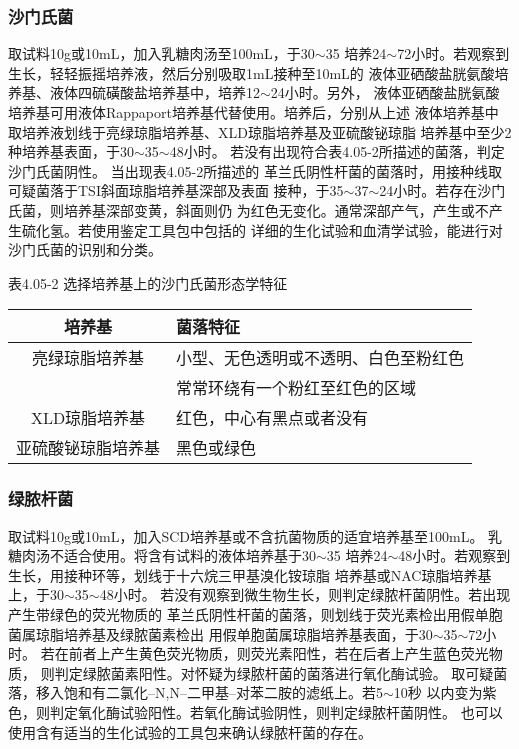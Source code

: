 \documentclass[11pt,a4paper]{article}
\newenvironment{SC}{%
  \CJKfamily{gbsn}%
  \CJKtilde
  \CJKnospace}{}
\begin{document}
\begin{CJK}{UTF8}{}
\begin{SC}
\subsubsection{沙门氏菌\endnote{}}
取试料10g或10mL，加入乳糖肉汤至100mL，于30$\sim$35\textcelsius
培养24$\sim$72小时。若观察到生长，轻轻振摇培养液，然后分别吸取1mL接种至10mL的
液体亚硒酸盐胱氨酸培养基、液体四硫磺酸盐培养基中，培养12$\sim$24小时。另外，
液体亚硒酸盐胱氨酸培养基可用液体Rappaport培养基代替使用。培养后，分别从上述
液体培养基中取培养液划线于亮绿琼脂培养基、XLD琼脂培养基及亚硫酸铋琼脂
培养基中至少2种培养基表面，于30$\sim$35$\sim$48小时。
若没有出现符合表4.05-2所描述的菌落，判定沙门氏菌阴性。
当出现表4.05-2所描述的
革兰氏阴性杆菌的菌落时，用接种线取可疑菌落于TSI斜面琼脂培养基深部及表面
接种，于35$\sim$37$\sim$24小时。若存在沙门氏菌，则培养基深部变黄，斜面则仍
为红色无变化\endnote{}。通常深部产气，产生或不产生硫化氢。若使用鉴定工具包中包括的
详细的生化试验和血清学试验，能进行对沙门氏菌的识别和分类。
\begin{table}[htb]
\begin{center}
表4.05-2 选择培养基上的沙门氏菌形态学特征\\
\begin{tabular}{c|l}
\hline
培养基&菌落特征\\
\hline
亮绿琼脂培养基&小型、无色透明或不透明、白色至粉红色\\
&常常环绕有一个粉红至红色的区域\\
\hline
XLD琼脂培养基&红色，中心有黑点或者没有\\
\hline
亚硫酸铋琼脂培养基&黑色或绿色\\
\hline
\end{tabular}
\end{center}
\end{table}
\subsubsection{绿脓杆菌\endnote{}}
取试料10g或10mL，加入SCD培养基或不含抗菌物质的适宜培养基至100mL。
乳糖肉汤不适合使用。将含有试料的液体培养基于30$\sim$35\textcelsius
培养24$\sim$48小时。若观察到生长，用接种环等，划线于十六烷三甲基溴化铵琼脂
培养基或NAC琼脂培养基上，于30$\sim$35$\sim$48小时。
若没有观察到微生物生长，则判定绿脓杆菌阴性。若出现产生带绿色的荧光物质的
革兰氏阴性杆菌的菌落，则划线于荧光素检出用假单胞菌属琼脂培养基及绿脓菌素检出
用假单胞菌属琼脂培养基表面，于30$\sim$35$\sim$72小时。
若在前者上产生黄色荧光物质，则荧光素阳性，若在后者上产生蓝色荧光物质，
则判定绿脓菌素阳性。对怀疑为绿脓杆菌的菌落进行氧化酶试验。
取可疑菌落，移入饱和有二氯化--N,N--二甲基--对苯二胺的滤纸上。若5$\sim$10秒
以内变为紫色，则判定氧化酶试验阳性。若氧化酶试验阴性，则判定绿脓杆菌阴性。
也可以使用含有适当的生化试验的工具包来确认绿脓杆菌的存在。

\end{SC}
\end{CJK}
\end{document}
